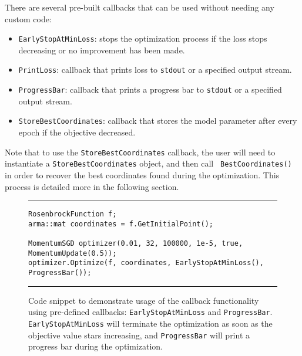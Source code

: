 There are several pre-built callbacks that can be used without
needing any custom code:

\begin{itemize}
  \item {\tt EarlyStopAtMinLoss}: stops the optimization process if the loss
stops decreasing or no improvement has been made.

  \item {\tt PrintLoss}: callback that prints loss to {\tt stdout} or a
specified output stream.

  \item {\tt ProgressBar}: callback that prints a progress bar to {\tt stdout}
or a specified output stream.

  \item {\tt StoreBestCoordinates}: callback that stores the model parameter
after every epoch if the objective decreased.
\end{itemize}

Note that to use the {\tt StoreBestCoordinates} callback, the user will need to
instantiate a {\tt StoreBestCoordinates} object, and then call {\tt
BestCoordinates()} in order to recover the best coordinates found during the
optimization.  This process is detailed more in the following section.

\begin{figure}[b!]
\centering
\hrule
\vspace{1ex}
\begin{verbatim}
RosenbrockFunction f;
arma::mat coordinates = f.GetInitialPoint();

MomentumSGD optimizer(0.01, 32, 100000, 1e-5, true, MomentumUpdate(0.5));
optimizer.Optimize(f, coordinates, EarlyStopAtMinLoss(), ProgressBar());
\end{verbatim}
\hrule
\vspace*{-0.5em}
\caption
  {
  Code snippet to demonstrate usage of the callback functionality using
pre-defined callbacks: \texttt{EarlyStopAtMinLoss} and \texttt{ProgressBar}.
{\tt EarlyStopAtMinLoss} will terminate the optimization as soon as the
objective value stars increasing, and {\tt ProgressBar} will print a progress
bar during the optimization.
  }
\label{fig:example_prog_callbacks}
\end{figure}


